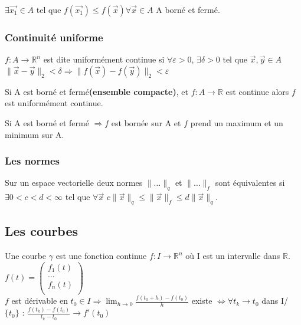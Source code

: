 \documentclass[../main.tex]{subfiles}
\begin{document}
\begin{theorem}
$\exists \vec{x_1} \in A$ tel que $f(\vec{x_1}) \leq f(\vec{x}) \forall \vec{x} \in A$ A borné et fermé. \end{theorem}

\subsubsection{Continuité uniforme}
$f:A\rightarrow \mathbb{R}^n$ est dite uniformément continue si $\forall \varepsilon > 0$, $\exists \delta >0$ tel que $\vec{x}, \vec{y} \in A$\\
$\parallel \vec{x}-\vec{y}\parallel_2< \delta \Rightarrow \parallel f(\vec{x})-f(\vec{y})\parallel_2 < \varepsilon$\\

\begin{theorem}Si A est borné et fermé\textbf{(ensemble compacte)}, et $f:A\rightarrow \mathbb{R}$ est continue alors $f$ est uniformément continue.\end{theorem}

\begin{theorem}Si A est borné et fermé $\Rightarrow f$ est bornée sur A et $f$ prend un maximum et un minimum sur A.\end{theorem}

\subsubsection{Les normes}
Sur un espace vectorielle deux normes $\parallel \dots \parallel_q$ et $\parallel\dots\parallel_f$ sont équivalentes si $\exists 0<c<d<\infty$ tel que $\forall \vec{x}$ $c\parallel \vec{x}\parallel_q \leq \parallel \vec{x}\parallel_f \leq d \parallel\vec{x}\parallel_q$.\\

\subsection{Les courbes}
Une courbe $\gamma$ est une fonction continue $f:I\rightarrow \mathbb{R}^n$ où I est un intervalle dans $\mathbb{R}$. $f(t) = \begin{pmatrix}
    f_1(t)\\
    \dots\\
    f_n(t)\\
\end{pmatrix}$\\

$f$ est dérivable en $t_0 \in I \Rightarrow \lim_{h\rightarrow0} \frac{f(t_0+h)-f(t_0)}{h}$ existe $\Leftrightarrow \forall t_k \rightarrow t_0$ dans I/$\{t_0\}$ : $\frac{f(t_k) - f(t_0)}{t_k-t_0} \rightarrow f'(t_0)$\\
\end{document}
